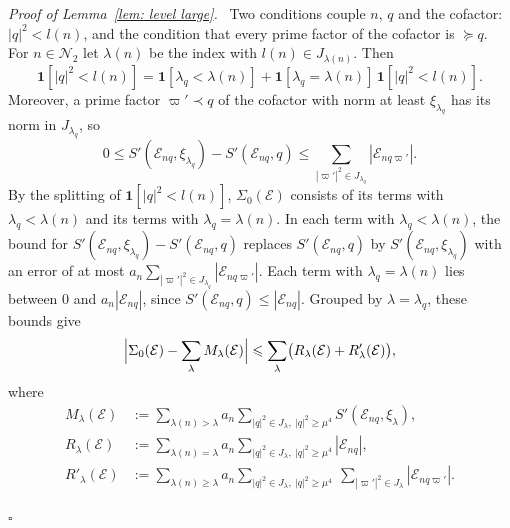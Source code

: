 \documentclass{article}
\numberwithin{equation}{section}
\newenvironment{proof}[1][Proof]{\par\medskip\noindent\textit{#1.}\ }{\hfill$\square$\par\medskip}
\newcommand{\Le}{\leqslant}
\newcommand{\Ge}{\geqslant}
\begin{document}
\begin{proof}[Proof of Lemma~\ref{lem: level large}]
Two conditions couple $n$, $q$ and the cofactor: $|q|^2 < l(n)$, and the condition that every prime factor of the cofactor is $\succcurlyeq q$. For $n \in \mathcal{N}_2$ let $\lambda(n)$ be the index with $l(n) \in J_{\lambda(n)}$. Then
\begin{equation*}
\mathbf{1}[|q|^2 < l(n)] = \mathbf{1}[\lambda_q < \lambda(n)] + \mathbf{1}[\lambda_q = \lambda(n)]\, \mathbf{1}[|q|^2 < l(n)].
\end{equation*}
Moreover, a prime factor $\varpi' \prec q$ of the cofactor with norm at least $\xi_{\lambda_q}$ has its norm in $J_{\lambda_q}$, so
\begin{equation*}
0 \Le S'(\mathcal{E}_{nq}, \xi_{\lambda_q}) - S'(\mathcal{E}_{nq}, q) \Le \sum_{|\varpi'|^2 \in J_{\lambda_q}} |\mathcal{E}_{nq\varpi'}|.
\end{equation*}
By the splitting of $\mathbf{1}[|q|^2 < l(n)]$, $\Sigma_0(\mathcal{E})$ consists of its terms with $\lambda_q < \lambda(n)$ and its terms with $\lambda_q = \lambda(n)$. In each term with $\lambda_q < \lambda(n)$, the bound for $S'(\mathcal{E}_{nq}, \xi_{\lambda_q}) - S'(\mathcal{E}_{nq}, q)$ replaces $S'(\mathcal{E}_{nq}, q)$ by $S'(\mathcal{E}_{nq}, \xi_{\lambda_q})$ with an error of at most $a_n \sum_{|\varpi'|^2 \in J_{\lambda_q}} |\mathcal{E}_{nq\varpi'}|$. Each term with $\lambda_q = \lambda(n)$ lies between $0$ and $a_n |\mathcal{E}_{nq}|$, since $S'(\mathcal{E}_{nq}, q) \Le |\mathcal{E}_{nq}|$. Grouped by $\lambda = \lambda_q$, these bounds give
\begin{equation}
\label{eq: level large split}
\Bigl| \Sigma_0(\mathcal{E}) - \sum_\lambda M_\lambda(\mathcal{E}) \Bigr| \Le \sum_\lambda \bigl( R_\lambda(\mathcal{E}) + R'_\lambda(\mathcal{E}) \bigr),
\end{equation}
where
\begin{equation*}
\begin{aligned}
M_\lambda(\mathcal{E}) &:= \sum_{\lambda(n) > \lambda} a_n \sum_{|q|^2 \in J_\lambda,\ |q|^2 \Ge \mu^4} S'(\mathcal{E}_{nq}, \xi_\lambda), \\
R_\lambda(\mathcal{E}) &:= \sum_{\lambda(n) = \lambda} a_n \sum_{|q|^2 \in J_\lambda,\ |q|^2 \Ge \mu^4} |\mathcal{E}_{nq}|, \\
R'_\lambda(\mathcal{E}) &:= \sum_{\lambda(n) \Ge \lambda} a_n \sum_{|q|^2 \in J_\lambda,\ |q|^2 \Ge \mu^4}\ \sum_{|\varpi'|^2 \in J_\lambda} |\mathcal{E}_{nq\varpi'}|.
\end{aligned}
\end{equation*}


\end{proof}
\end{document}
